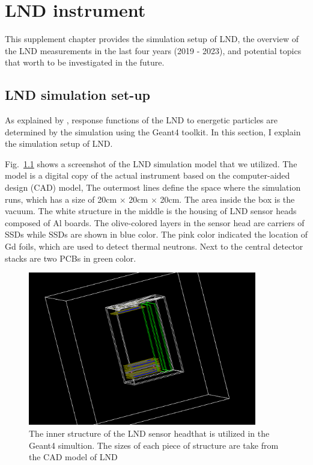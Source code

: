 \chapter{LND instrument}
\label{chp:LNDinstrument}

This supplement chapter provides the simulation setup of \ac{LND}, the overview of the \ac{LND} measurements in the last four years (2019 - 2023), and potential topics that worth to be investigated in the future.

\section*{LND simulation set-up}
\label{chp:LNDsimulation}

As explained by \citet{Wimmer2020SSRv}, response functions of the \ac{LND} to energetic particles are determined by the simulation using the \ac{Geant4} toolkit. In this section, I explain the simulation setup of \ac{LND}.

Fig.~\ref{fig:LND_simulation_model} shows a screenshot of the \ac{LND} simulation model that we utilized. The model is a digital copy of the actual instrument based on the computer-aided design (CAD) model, 
The outermost lines define the space where the simulation runs, which has a size of 20cm $\times$ 20cm $\times$ 20cm. The area inside the box is the vacuum. The white structure in the middle is the housing of \ac{LND} sensor heads composed of Al boards.
The olive-colored layers in the sensor head are carriers of \acp{SSD} while \acp{SSD} are shown in blue color. The pink color indicated the location of Gd foils, which are used to detect thermal neutrons. Next to the central detector stacks are two \acp{PCB} in green color.

\begin{figure}[!htb]
    \centering
    \includegraphics[width= 0.89\textwidth, height = 0.6\textwidth]{images/LND_model.png}
    \caption[The sketch of \ac{LND} sensor head]{The inner structure of the \ac{LND} sensor headthat is utilized in the \ac{Geant4} simultion. The sizes of each piece of structure are take from the CAD model of \ac{LND}}
    \label{fig:LND_simulation_model}
\end{figure}


